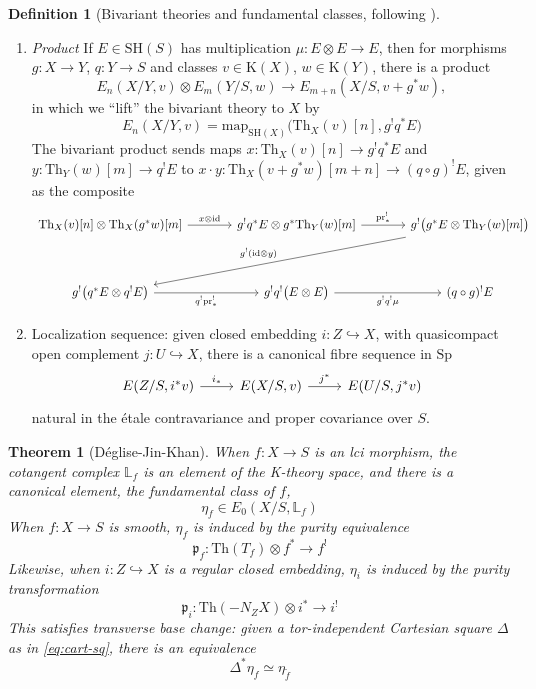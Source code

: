\documentclass[11pt, twoside]{article}
\numberwithin{equation}{section}
\newtheorem{theorem}[equation]{Theorem}
\theoremstyle{definition}
\newtheorem{definition}[equation]{Definition}
\newcommand{\bb}[1]{\mathbb{#1}}
\newcommand{\p}{\mathfrak{p}}
\newcommand{\id}{\mathrm{id} }
\newcommand{\pr}{\mathrm{pr}}
\newcommand{\map}{\mathrm{map}}
\newcommand{\sh}{\mathrm{SH}}
\newcommand{\Sp}{\mathrm{Sp}}
\newcommand{\K}{\mathrm{K}}
\begin{document}
\begin{definition}[Bivariant theories and fundamental classes, following \cite{DJK}]
\begin{enumerate}
\item \emph{Product}
If \(E \in \sh(S)\) has multiplication \(\mu \colon E \otimes E \to E\), then for morphisms \(g \colon X \to Y\), \(q \colon Y \to S\) and classes \(v \in \K(X)\), \(w \in \K(Y)\), there is a product
\[E_n(X/Y, v) \otimes E_m(Y/S, w) \to E_{m + n}(X/S, v + g^*w),\]
in which we ``lift'' the bivariant theory to \(X\) by 
\[E_n(X/Y, v) = \map_{\sh(X)}\big(\mathrm{Th}_X(v)[n], g^! q^*E)\]
The bivariant product sends maps \(x \colon \mathrm{Th}_X(v)[n] \to g^!q^*E\) and \(y \colon \mathrm{Th}_Y(w)[m] \to q^!E\) to \(x \cdot y \colon \mathrm{Th}_X(v + g^*w)[m + n] \to (q \circ g)^! E\), given as the composite 
\[\begin{tikzcd} [column sep = large]
\mathrm{Th}_X(v)[n] \otimes \mathrm{Th}_X(g^*w)[m] \ar[r, "x \otimes \id"] & g^!q^*E \otimes g^*\mathrm{Th}_Y(w)[m] \ar[r, "\pr_*^!"] & g^!\big(g^*E \otimes \mathrm{Th}_Y(w)[m]\big) \ar[ddll, "g^!(\id \otimes y)", swap]\\
\\
g^!\big(q^*E \otimes q^!E\big) \ar[r, "q^! \pr_*^!", swap] & g^! q^! \big(E \otimes E\big) \ar[r, "g^! q^! \mu", swap] & (q \circ g)^! E
\end{tikzcd}\]

\item Localization sequence: given closed embedding \(i \colon Z \hookrightarrow X\), with quasicompact open complement \(j \colon U \hookrightarrow X\), there is a canonical fibre sequence in \(\Sp\) 
\[\begin{tikzcd}
E(Z/S, i^*v) \ar[r, "i_*"] & E(X/S, v) \ar[r, "j^*"] & E(U/S, j^*v)
\end{tikzcd}\]
natural in the étale contravariance and  proper covariance over \(S\).
\end{enumerate} 
\end{definition}

\begin{theorem}[Déglise-Jin-Khan]\label{thm:fund-class}
When \(f \colon X \to S\) is an lci morphism, the cotangent complex \(\bb{L}_f\) is an element of the K-theory space, and there is a canonical element, the \emph{fundamental class of \(f\)},
\[\eta_f \in E_0(X/S, \bb{L}_f)\]
When \(f \colon X \to S\) is smooth, \(\eta_f\) is induced by the purity equivalence 
\[\p_f \colon \mathrm{Th}(T_f) \otimes f^* \to f^!\]
Likewise, when \(i \colon Z \hookrightarrow X\) is a regular closed embedding, \(\eta_i\) is induced by the purity transformation 
\[\p_i \colon \mathrm{Th}(- N_Z X) \otimes i^* \to i^!\]
This satisfies \emph{transverse base change}: given a tor-independent Cartesian square \(\Delta\) as in \eqref{eq:cart-sq}, there is an equivalence 
\begin{equation}\label{eq:tranv-b-ch}
\Delta^*\eta_f \simeq \eta_{\tilde{f}}
\end{equation}
\end{theorem}
\end{document}
